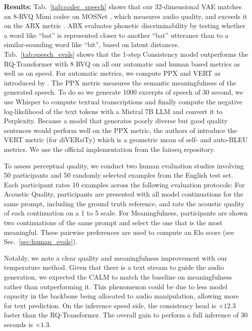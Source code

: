 \noindent\textbf{Results:} Tab.~\ref{tab:codec_speech} shows that our 32-dimensional VAE matches an 8-RVQ Mimi codec on MOSNet \citep{mosnet}, which measures audio quality, and exceeds it on the ABX metric \citep{abx}. ABX evaluates phonetic discriminability by testing whether a word like “bat” is represented closer to another “bat” utterance than to a similar-sounding word like “bit”, based on latent distances.
Tab.~\ref{tab:speech_evals} shows that the 1-step Consistency model outperforms the RQ-Transformer with 8 RVQ on all our automatic and human based metrics as well as on speed. For automatic metrics, we compute PPX and VERT as introduced by \citet{ppx_vert}. The PPX metric measures the semantic meaningfulness of the generated speech. To do so we generate 1000 excerpts of speech of 30 second, we use Whisper \citep{whisper} to compute textual transcriptions and finally compute the negative log-likelihood of the text tokens with a Mistral 7B LLM \cite{mistral7b} and convert it to Perplexity. Because a model that generates poorly diverse but good quality sentences would perform well on the PPX metric, the authors of \citep{ppx_vert} introduce the VERT metric (for diVERsiTy) which is a geometric mean of self- and auto-BLEU metrics. We use the official implementation from the fairseq \cite{fairseq} repository. 

To assess perceptual quality, we conduct two human evaluation studies involving 50 participants and 50 randomly selected examples from the English test set. Each participant rates 10 examples across the following evaluation protocols: For Acoustic Quality, participants are presented with all model continuations for the same prompt, including the ground truth reference, and rate the acoustic quality of each continuation on a 1 to 5 scale. For Meaningfulness, participants are shown two continuations of the same prompt and select the one that is the most meaningful. These pairwise preferences are used to compute an Elo score (see Sec.~\ref{sec:human_evals}). 

Notably, we note a clear quality and meaningfulness improvement with our temperature method. Given that there is a text stream to guide the audio generation, we expected the CALM to match the baseline on meaningfulness rather than outperforming it. This phenomenon could be due to less model capacity in the backbone being allocated to audio manipulation, allowing more for text prediction.
On the inference speed side, the consistency head is $\times12.3$ faster than the RQ-Transformer. The overall gain to perform a full inference of 30 seconds is $\times1.3$.

